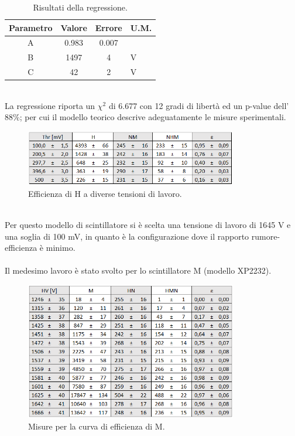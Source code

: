 \documentclass[11pt]{article} %
\begin{document}
\begin{table}[!h]
\begin{center}
\begin{tabular}{|c|c|c|l|}
\hline
\multicolumn{1}{|l|}{Parametro} & \multicolumn{1}{l|}{Valore} & \multicolumn{1}{l|}{Errore} & U.M. \\ \hline
A                               & 0.983                       & 0.007                       &      \\ \hline
B                               & 1497                        & 4                           & V    \\ \hline
C                               & 42                          & 2                           & V    \\ \hline
\end{tabular}
\end{center}
\caption{Risultati della regressione.}
\end{table}
\\La regressione riporta un $\chi ^2$ di 6.677 con 12 gradi di libertà ed un p-value dell'$88\%$; per cui il modello teorico descrive adeguatamente le misure sperimentali.
\begin{figure}[!h]
\begin{center}
\includegraphics[width=350px]{img/thres_H.png}
\caption{Efficienza di H a diverse tensioni di lavoro.}
\label{fig:thres_H}
\end{center}
\end{figure}
\\Per questo modello di scintillatore si è scelta una tensione di lavoro di 1645 V e una soglia di 100 mV, in quanto è la configurazione dove il rapporto rumore-efficienza è minimo.\\
\\Il medesimo lavoro è stato svolto per lo scintillatore M (modello XP2232).
\begin{figure}[h!]
\begin{center}
\includegraphics[width=350px]{img/table_M.png}
\caption{Misure per la curva di efficienza di M.}
\label{fig:table_M}
\end{center}
\end{figure}
\end{document}
